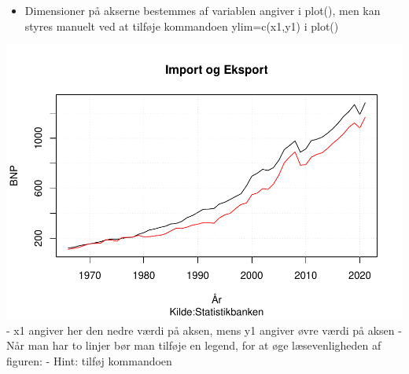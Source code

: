 \documentclass[
  12pt,
]{article}
\newenvironment{Shaded}{\begin{snugshade}}{\end{snugshade}}
\newcommand{\AttributeTok}[1]{\textcolor[rgb]{0.77,0.63,0.00}{#1}}
\newcommand{\DecValTok}[1]{\textcolor[rgb]{0.00,0.00,0.81}{#1}}
\newcommand{\FunctionTok}[1]{\textcolor[rgb]{0.00,0.00,0.00}{#1}}
\newcommand{\NormalTok}[1]{#1}
\newcommand{\SpecialCharTok}[1]{\textcolor[rgb]{0.00,0.00,0.00}{#1}}
\newcommand{\StringTok}[1]{\textcolor[rgb]{0.31,0.60,0.02}{#1}}
\providecommand{\tightlist}{%
  \setlength{\itemsep}{0pt}\setlength{\parskip}{0pt}}
\begin{document}
\begin{itemize}
\tightlist
\item
  Dimensioner på akserne bestemmes af variablen angiver i plot(), men
  kan styres manuelt ved at tilføje kommandoen ylim=c(x1,y1) i plot()
\end{itemize}

\begin{Shaded}
\end{Shaded}

\includegraphics{Rkursus_done_files/figure-latex/unnamed-chunk-11-1.pdf}
- x1 angiver her den nedre værdi på aksen, mens y1 angiver øvre værdi på
aksen - Når man har to linjer bør man tilføje en legend, for at øge
læsevenligheden af figuren: - Hint: tilføj kommandoen
\end{document}
